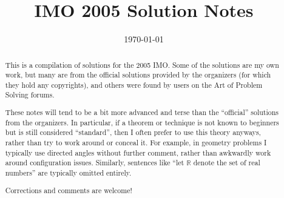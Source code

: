\documentclass[11pt]{scrartcl}
\title{IMO 2005 Solution Notes}
\date{\today}
\begin{document}
\maketitle

\begin{abstract}
This is a compilation of solutions
for the 2005 IMO.
Some of the solutions are my own work,
but many are from the official solutions provided by the organizers
(for which they hold any copyrights),
and others were found by users on the Art of Problem Solving forums.

These notes will tend to be a bit more advanced and terse than the ``official''
solutions from the organizers.
In particular, if a theorem or technique is not known to beginners
but is still considered ``standard'', then I often prefer to
use this theory anyways, rather than try to work around or conceal it.
For example, in geometry problems I typically use directed angles
without further comment, rather than awkwardly work around configuration issues.
Similarly, sentences like ``let $\mathbb{R}$ denote the set of real numbers''
are typically omitted entirely.

Corrections and comments are welcome!
\end{abstract}

\tableofcontents
\newpage

\addtocounter{section}{-1}
\end{document}
